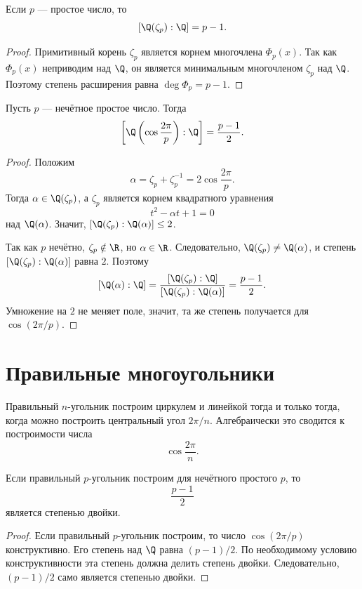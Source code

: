 \begin{stmt}
    Если $p$ --- простое число, то
    \[
        [\Q(\zeta_p):\Q]=p-1.
    \]

    \begin{proof}
        Примитивный корень $\zeta_p$ является корнем многочлена $\Phi_p(x)$. Так как $\Phi_p(x)$ неприводим над
        $\Q$, он является минимальным многочленом $\zeta_p$ над $\Q$. Поэтому степень расширения равна
        $\deg \Phi_p=p-1$.
    \end{proof}
\end{stmt}

\begin{stmt}
    Пусть $p$ --- нечётное простое число. Тогда
    \[
        \left[\Q\left(\cos\frac{2\pi}{p}\right):\Q\right]=\frac{p-1}{2}.
    \]

    \begin{proof}
        Положим
        \[
            \alpha=\zeta_p+\zeta_p^{-1}=2\cos\frac{2\pi}{p}.
        \]
        Тогда $\alpha\in\Q(\zeta_p)$, а $\zeta_p$ является корнем квадратного уравнения
        \[
            t^2-\alpha t+1=0
        \]
        над $\Q(\alpha)$. Значит, $[\Q(\zeta_p):\Q(\alpha)]\le2$.

        Так как $p$ нечётно, $\zeta_p\notin\R$, но $\alpha\in\R$. Следовательно, $\Q(\zeta_p)\neq\Q(\alpha)$,
        и степень $[\Q(\zeta_p):\Q(\alpha)]$ равна $2$. Поэтому
        \[
            [\Q(\alpha):\Q]=\frac{[\Q(\zeta_p):\Q]}{[\Q(\zeta_p):\Q(\alpha)]}=\frac{p-1}{2}.
        \]
        Умножение на $2$ не меняет поле, значит, та же степень получается для $\cos(2\pi/p)$.
    \end{proof}
\end{stmt}

\section{Правильные многоугольники}

\begin{definition}
    Правильный $n$-угольник построим циркулем и линейкой тогда и только тогда, когда можно построить центральный угол
    $2\pi/n$. Алгебраически это сводится к построимости числа
    \[
        \cos\frac{2\pi}{n}.
    \]
\end{definition}

\begin{stmt}
    Если правильный $p$-угольник построим для нечётного простого $p$, то
    \[
        \frac{p-1}{2}
    \]
    является степенью двойки.

    \begin{proof}
        Если правильный $p$-угольник построим, то число $\cos(2\pi/p)$ конструктивно. Его степень над
        $\Q$ равна $(p-1)/2$. По необходимому условию конструктивности эта степень должна делить степень двойки.
        Следовательно, $(p-1)/2$ само является степенью двойки.
    \end{proof}
\end{stmt}

